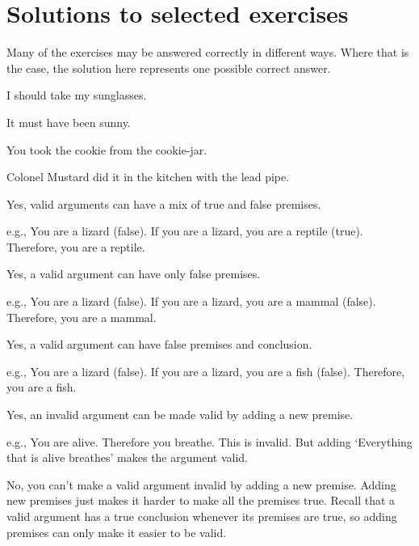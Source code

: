 \documentclass[PHIL101-Textbook.tex]{subfiles}
\begin{document}
\chapter{Solutions to selected exercises}
\label{app.solutions}

Many of the exercises may be answered correctly in different ways. Where that is the case, the solution here represents one possible correct answer.

\medskip


\begin{earg}
	\item I should take my sunglasses.
	\item It must have been sunny.
	\item You took the cookie from the cookie-jar.
	\item Colonel Mustard did it in the kitchen with the lead pipe.
\end{earg}



	\begin{earg}
		\item Yes, valid arguments can have a mix of true and false premises. 
		
		e.g., You are a lizard (false). If you are a lizard, you are a reptile (true). Therefore, you are a reptile. 
		\item Yes, a valid argument can have only false premises.
		
		e.g., You are a lizard (false). If you are a lizard, you are a mammal (false). Therefore, you are a mammal. 
		\item Yes, a valid argument can have false premises and conclusion.
		
		e.g., You are a lizard (false). If you are a lizard, you are a fish (false). Therefore, you are a fish.
 		\item Yes, an invalid argument can be made valid by adding a new premise.
 		
 		e.g., You are alive. Therefore you breathe. This is invalid. But adding `Everything that is alive breathes' makes the argument valid.
		\item No, you can't make a valid argument invalid by adding a new premise. Adding new premises just makes it harder to make all the premises true. Recall that a valid argument has a true conclusion whenever its premises are true, so adding premises can only make it easier to be valid.
	\end{earg}
\pagebreak
\end{document}
